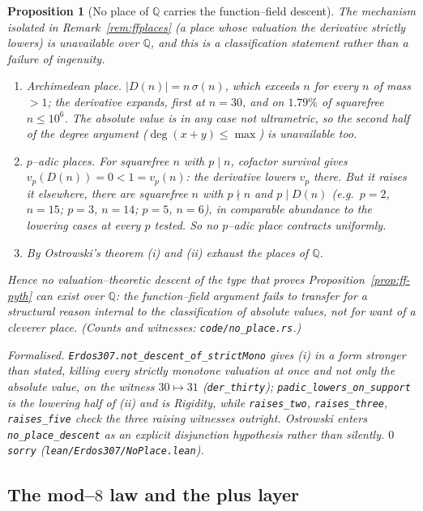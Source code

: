 \documentclass[11pt]{article}
\newtheorem{proposition}[theorem]{Proposition}
\theoremstyle{definition}
\begin{document}
\begin{proposition}[No place of $\mathbb{Q}$ carries the function--field descent]\label{prop:noplace}
The mechanism isolated in Remark~\ref{rem:ffplaces} (a place whose valuation the derivative
strictly lowers) is unavailable over $\mathbb{Q}$, and this is a classification statement rather
than a failure of ingenuity.
\begin{enumerate}[label=\textup{(\roman*)},leftmargin=2.2em]
\item \emph{Archimedean place.} $|D(n)|=n\,\sigma(n)$, which exceeds $n$ for every $n$ of mass
$>1$; the derivative \emph{expands}, first at $n=30$, and on $1.79\%$ of squarefree $n\le10^6$.
The absolute value is in any case not ultrametric, so the second half of the degree argument
($\deg(x+y)\le\max$) is unavailable too.
\item \emph{$p$--adic places.} For squarefree $n$ with $p\mid n$, cofactor survival gives
$v_p(D(n))=0<1=v_p(n)$: the derivative lowers $v_p$ there. But it \emph{raises} it elsewhere,
there are squarefree $n$ with $p\nmid n$ and $p\mid D(n)$ (e.g.\ $p=2$, $n=15$; $p=3$, $n=14$;
$p=5$, $n=6$), in comparable abundance to the lowering cases at every $p$ tested. So no $p$--adic
place contracts uniformly.
\item By Ostrowski's theorem \textup{(i)} and \textup{(ii)} exhaust the places of $\mathbb{Q}$.
\end{enumerate}
Hence no valuation--theoretic descent of the type that proves Proposition~\ref{prop:ff-pyth} can
exist over $\mathbb{Q}$: the function--field argument fails to transfer for a structural reason
internal to the classification of absolute values, not for want of a cleverer place.
(Counts and witnesses: \texttt{code/no\_place.rs}.)

\textup{Formalised.} \texttt{Erdos307.not\_descent\_of\_strictMono} gives \textup{(i)} in a form
stronger than stated, killing \emph{every} strictly monotone valuation at once and not only the
absolute value, on the witness $30\mapsto31$ \textup{(}\texttt{der\_thirty}\textup{)};
\texttt{padic\_lowers\_on\_support} is the lowering half of \textup{(ii)} and is Rigidity, while
\texttt{raises\_two}, \texttt{raises\_three}, \texttt{raises\_five} check the three raising
witnesses outright. Ostrowski enters \texttt{no\_place\_descent} as an explicit disjunction
hypothesis rather than silently. $0$ \texttt{sorry}
\textup{(\texttt{lean/Erdos307/NoPlace.lean})}.
\end{proposition}

\subsection{The mod--$8$ law and the plus layer}\label{ssec:pluslayer}
\end{document}
